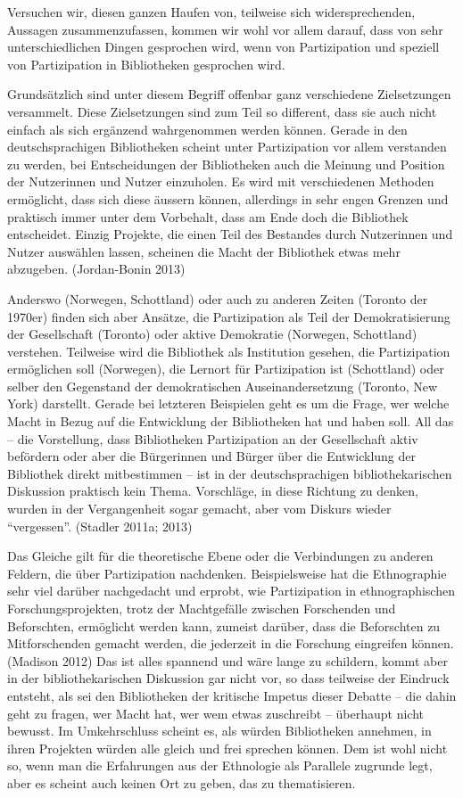 \documentclass[a4paper,
fontsize=11pt,
oneside,
numbers=noperiodatend,
parskip=half-,
bibliography=totoc,
final
]{scrartcl}
\begin{document}
Versuchen wir, diesen ganzen Haufen von, teilweise sich
widersprechenden, Aussagen zusammenzufassen, kommen wir wohl vor allem
darauf, dass von sehr unterschiedlichen Dingen gesprochen wird, wenn von
Partizipation und speziell von Partizipation in Bibliotheken gesprochen
wird.

Grundsätzlich sind unter diesem Begriff offenbar ganz verschiedene
Zielsetzungen versammelt. Diese Zielsetzungen sind zum Teil so
different, dass sie auch nicht einfach als sich ergänzend wahrgenommen
werden können. Gerade in den deutschsprachigen Bibliotheken scheint
unter Partizipation vor allem verstanden zu werden, bei Entscheidungen
der Bibliotheken auch die Meinung und Position der Nutzerinnen und
Nutzer einzuholen. Es wird mit verschiedenen Methoden ermöglicht, dass
sich diese äussern können, allerdings in sehr engen Grenzen und
praktisch immer unter dem Vorbehalt, dass am Ende doch die Bibliothek
entscheidet. Einzig Projekte, die einen Teil des Bestandes durch
Nutzerinnen und Nutzer auswählen lassen, scheinen die Macht der
Bibliothek etwas mehr abzugeben. (Jordan-Bonin 2013)

Anderswo (Norwegen, Schottland) oder auch zu anderen Zeiten (Toronto der
1970er) finden sich aber Ansätze, die Partizipation als Teil der
Demokratisierung der Gesellschaft (Toronto) oder aktive Demokratie
(Norwegen, Schottland) verstehen. Teilweise wird die Bibliothek als
Institution gesehen, die Partizipation ermöglichen soll (Norwegen), die
Lernort für Partizipation ist (Schottland) oder selber den Gegenstand
der demokratischen Auseinandersetzung (Toronto, New York) darstellt.
Gerade bei letzteren Beispielen geht es um die Frage, wer welche Macht
in Bezug auf die Entwicklung der Bibliotheken hat und haben soll. All
das -- die Vorstellung, dass Bibliotheken Partizipation an der
Gesellschaft aktiv befördern oder aber die Bürgerinnen und Bürger über
die Entwicklung der Bibliothek direkt mitbestimmen -- ist in der
deutschsprachigen bibliothekarischen Diskussion praktisch kein Thema.
Vorschläge, in diese Richtung zu denken, wurden in der Vergangenheit
sogar gemacht, aber vom Diskurs wieder \enquote{vergessen}. (Stadler
2011a; 2013)

Das Gleiche gilt für die theoretische Ebene oder die Verbindungen zu
anderen Feldern, die über Partizipation nachdenken. Beispielsweise hat
die Ethnographie sehr viel darüber nachgedacht und erprobt, wie
Partizipation in ethnographischen Forschungsprojekten, trotz der
Machtgefälle zwischen Forschenden und Beforschten, ermöglicht werden
kann, zumeist darüber, dass die Beforschten zu Mitforschenden gemacht
werden, die jederzeit in die Forschung eingreifen können. (Madison 2012)
Das ist alles spannend und wäre lange zu schildern, kommt aber in der
bibliothekarischen Diskussion gar nicht vor, so dass teilweise der
Eindruck entsteht, als sei den Bibliotheken der kritische Impetus dieser
Debatte -- die dahin geht zu fragen, wer Macht hat, wer wem etwas
zuschreibt -- überhaupt nicht bewusst. Im Umkehrschluss scheint es, als
würden Bibliotheken annehmen, in ihren Projekten würden alle gleich und
frei sprechen können. Dem ist wohl nicht so, wenn man die Erfahrungen
aus der Ethnologie als Parallele zugrunde legt, aber es scheint auch
keinen Ort zu geben, das zu thematisieren.
\end{document}
